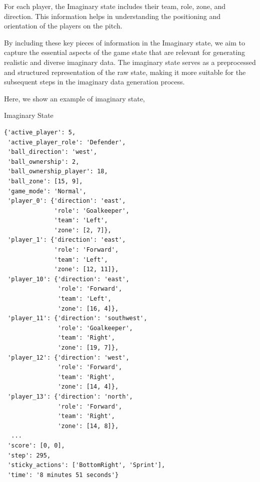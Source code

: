 For each player, the Imaginary state includes their team, role, zone, and direction. This information helps in understanding the positioning and orientation of the players on the pitch.

By including these key pieces of information in the Imaginary state, we aim to capture the essential aspects of the game state that are relevant for generating realistic and diverse imaginary data. The imaginary state serves as a preprocessed and structured representation of the raw state, making it more suitable for the subsequent steps in the imaginary data generation process.

Here, we show an example of imaginary state,


\begin{bbox}{Imaginary State}
\begin{verbatim}
{'active_player': 5,
 'active_player_role': 'Defender',
 'ball_direction': 'west',
 'ball_ownership': 2,
 'ball_ownership_player': 18,
 'ball_zone': [15, 9],
 'game_mode': 'Normal',
 'player_0': {'direction': 'east', 
              'role': 'Goalkeeper',
              'team': 'Left',
              'zone': [2, 7]},
 'player_1': {'direction': 'east',
              'role': 'Forward',
              'team': 'Left',
              'zone': [12, 11]},
 'player_10': {'direction': 'east',
               'role': 'Forward',
               'team': 'Left',
               'zone': [16, 4]},
 'player_11': {'direction': 'southwest',
               'role': 'Goalkeeper',
               'team': 'Right',
               'zone': [19, 7]},
 'player_12': {'direction': 'west',
               'role': 'Forward',
               'team': 'Right',
               'zone': [14, 4]},
 'player_13': {'direction': 'north',
               'role': 'Forward',
               'team': 'Right',
               'zone': [14, 8]},
  ...
 'score': [0, 0],
 'step': 295,
 'sticky_actions': ['BottomRight', 'Sprint'],
 'time': '8 minutes 51 seconds'}
\end{verbatim}
\end{bbox}


